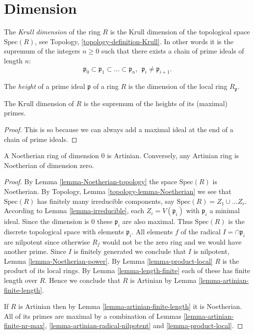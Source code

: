 \section{Dimension}
\label{section-dimension}

\begin{definition}
\label{definition-Krull}
The {\it Krull dimension} of the ring $R$ is the
Krull dimension of the topological space $\text{Spec}(R)$,
see Topology, \ref{topology-definition-Krull}.
In other words it is the supremum of the integers $n\geq 0$
such that there exists a chain of prime ideals of length $n$:
$$
\mathfrak p_0
\subset
\mathfrak p_1
\subset
\ldots
\subset
\mathfrak p_n, \ \ 
\mathfrak p_i \not= \mathfrak p_{i + 1}.
$$
\end{definition}

\begin{definition}
\label{definition-height}
The {\it height} of a prime ideal $\mathfrak p$ of
a ring $R$ is the dimension of the local ring $R_{\mathfrak p}$.
\end{definition}

\begin{lemma}
\label{lemma-dimension-height}
The Krull dimension of $R$ is the supremum of the
heights of its (maximal) primes.
\end{lemma}

\begin{proof}
This is so because we can always add a maximal ideal at the end of a chain
of prime ideals.
\end{proof}

\begin{lemma}
\label{lemma-Noetherian-dimension-0}
A Noetherian ring of dimension $0$ is Artinian.
Conversely, any Artinian ring is Noetherian of dimension zero.
\end{lemma}

\begin{proof}
By Lemma \ref{lemma-Noetherian-topology} the space $\text{Spec}(R)$
is Noetherian. By Topology, Lemma \ref{topology-lemma-Noetherian} we see
that $\text{Spec}(R)$ has finitely many irreducible
components, say $\text{Spec}(R) = Z_1 \cup \ldots Z_r$.
According to Lemma \ref{lemma-irreducible}, each $Z_i = V(\mathfrak p_i)$
with $\mathfrak p_i$ a minimal ideal. Since the dimension is $0$
these $\mathfrak p_i$ are also maximal. Thus $\text{Spec}(R)$
is the discrete topological space with elements $\mathfrak p_i$.
All elements $f$ of the radical $I = \cap \mathfrak p_i$
are nilpotent since otherwise $R_f$ would not be the zero ring
and we would have another prime. Since $I$ is finitely generated
we conclude that $I$ is nilpotent, Lemma \ref{lemma-Noetherian-power}.
By Lemma \ref{lemma-product-local} $R$ is the product of its
local rings. By Lemma \ref{lemma-length-finite} each of these
has finite length over $R$. Hence we conclude that $R$
is Artinian by Lemma \ref{lemma-artinian-finite-length}.

\medskip\noindent
If $R$ is Artinian then by Lemma \ref{lemma-artinian-finite-length}
it is Noetherian. All of its primes are maximal by a combination
of Lemmas \ref{lemma-artinian-finite-nr-max},
\ref{lemma-artinian-radical-nilpotent} and \ref{lemma-product-local}.
\end{proof}


